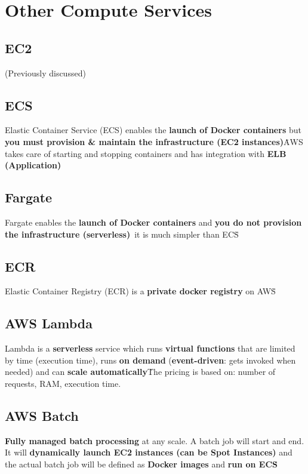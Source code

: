 \section{Other Compute Services}\label{sec:other-compute-services}

\subsection{EC2}\label{subsec:ec2}
(Previously discussed)

\subsection{ECS}\label{subsec:ecs}
Elastic Container Service (ECS) enables the \textbf{launch of Docker containers} but \textbf{you must provision \& maintain the infrastructure (EC2 instances)}\.
AWS takes care of starting and stopping containers and has integration with \textbf{ELB (Application)}\.

\subsection{Fargate}\label{subsec:fargate}
Fargate enables the \textbf{launch of Docker containers} and \textbf{you do not provision the infrastructure (serverless)}\, it is much simpler than ECS\.

\subsection{ECR}\label{subsec:ecr}
Elastic Container Registry (ECR) is a \textbf{private docker registry} on AWS\.

\subsection{AWS Lambda}\label{subsec:aws-lambda}
Lambda is a \textbf{serverless} service which runs \textbf{virtual functions} that are limited by time (execution time), runs \textbf{on demand} (\textbf{event-driven}: gets invoked when needed) and can \textbf{scale automatically}\.
The pricing is based on: number of requests, RAM, execution time.

\subsection{AWS Batch}\label{subsec:aws-batch}
\textbf{Fully managed batch processing} at any scale.
A batch job will start and end.
It will \textbf{dynamically launch EC2 instances (can be Spot Instances)} and the actual batch job will be defined as \textbf{Docker images} and \textbf{run on ECS}\.

